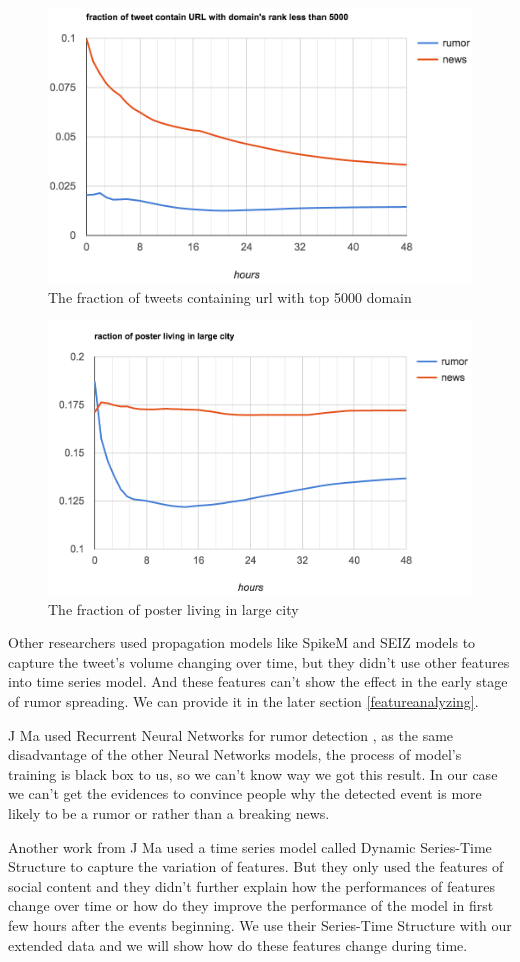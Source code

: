 \begin{figure}[!h]
\centering
\includegraphics[width=0.52\columnwidth]{images/url5000.png}
\caption{The fraction of tweets containing url with top 5000 domain}
\label{fig:Url5000}
\end{figure}
\begin{figure}[!h]
\centering
\includegraphics[width=0.52\columnwidth]{images/largecity.png}
\caption{The fraction of poster living in large city}
\label{fig:largecity}
\end{figure}

\newpage
Other researchers used propagation models like SpikeM \cite{kwon2013prominent} and SEIZ models \cite{jin2013epidemiological} to capture the tweet's volume changing over time, but they didn't use other features into time series model. And these features can't show the effect in the early stage of rumor spreading. We can provide it in the later section \ref{featureanalyzing}.

J Ma used Recurrent Neural Networks for rumor detection \cite{madetecting}, as the same disadvantage of the other Neural Networks models, the process of model's training is black box to us, so we can't know way we got this result. In our case we can't get the evidences to convince people why the detected event is more likely to be a rumor or rather than a breaking news. 

Another work from J Ma used a time series model called Dynamic Series-Time Structure \cite{ma2015detect} to capture the variation of features. But they only used the features of social content and they didn't further explain how the performances of features change over time or how do they improve the performance of the model in first few hours after the events beginning.  We use their Series-Time Structure with our extended data and we will show how do these features change during time.

